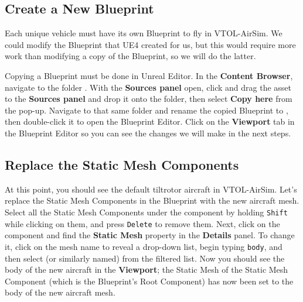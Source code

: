 \subsection{Create a New Blueprint}
Each unique vehicle must have its own Blueprint to fly in VTOL-AirSim. We could modify the  Blueprint that UE4 created for us, but this would require more work than modifying a copy of the  Blueprint, so we will do the latter.

Copying a Blueprint must be done in Unreal Editor. In the \textbf{Content Browser}, navigate to the folder . With the \textbf{Sources panel} open, click and drag the  asset to the \textbf{Sources panel} and drop it onto the  folder, then select \textbf{Copy here} from the pop-up. Navigate to that same folder and rename the copied Blueprint to , then double-click it to open the Blueprint Editor. Click on the \textbf{Viewport} tab in the Blueprint Editor so you can see the changes we will make in the next steps.

\subsection{Replace the Static Mesh Components}
At this point, you should see the default tiltrotor aircraft in VTOL-AirSim. Let's replace the Static Mesh Components in the Blueprint with the new aircraft mesh. Select all the Static Mesh Components under the  component by holding \texttt{Shift} while clicking on them, and press \texttt{Delete} to remove them. Next, click on the  component and find the \textbf{Static Mesh} property in the \textbf{Details} panel. To change it, click on the mesh name to reveal a drop-down list, begin typing \texttt{body}, and then select  (or similarly named) from the filtered list. Now you should see the body of the new aircraft in the \textbf{Viewport}; the Static Mesh of the  Static Mesh Component (which is the Blueprint's Root Component) has now been set to the body of the new aircraft mesh.

